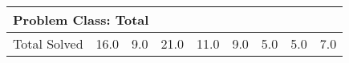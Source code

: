 \begin{tabular}{lrrrrrrrr}
\midrule
\multicolumn{9}{l}{\textbf{Problem Class: Total}} \\
\midrule
Total Solved & 16.0 & 9.0 & 21.0 & 11.0 & 9.0 & 5.0 & 5.0 & 7.0 \\
\bottomrule
\end{tabular}
